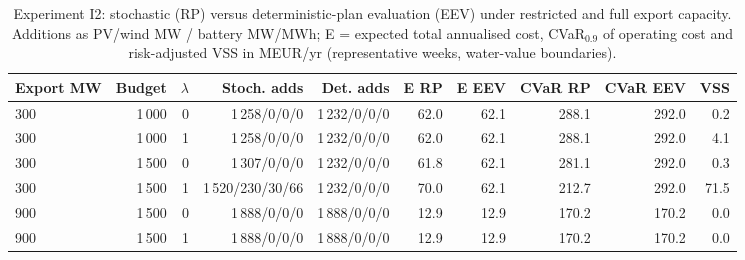 \begin{table}[htbp]
\centering
\scriptsize
\caption{Experiment I2: stochastic (RP) versus deterministic-plan evaluation (EEV) under restricted and full export capacity. Additions as PV/wind MW / battery MW/MWh; E = expected total annualised cost, CVaR$_{0.9}$ of operating cost and risk-adjusted VSS in MEUR/yr (representative weeks, water-value boundaries).}
\label{tab:i2}
\begin{adjustbox}{max width=\linewidth}
\begin{tabular}{lrrrrrrrrr}
\toprule
Export MW & Budget & $\lambda$ & Stoch. adds & Det. adds & E RP & E EEV & CVaR RP & CVaR EEV & VSS \\
\midrule
300 & 1\,000 & 0 & 1\,258/0/0/0 & 1\,232/0/0/0 & 62.0 & 62.1 & 288.1 & 292.0 & 0.2 \\
300 & 1\,000 & 1 & 1\,258/0/0/0 & 1\,232/0/0/0 & 62.0 & 62.1 & 288.1 & 292.0 & 4.1 \\
300 & 1\,500 & 0 & 1\,307/0/0/0 & 1\,232/0/0/0 & 61.8 & 62.1 & 281.1 & 292.0 & 0.3 \\
300 & 1\,500 & 1 & 1\,520/230/30/66 & 1\,232/0/0/0 & 70.0 & 62.1 & 212.7 & 292.0 & 71.5 \\
900 & 1\,500 & 0 & 1\,888/0/0/0 & 1\,888/0/0/0 & 12.9 & 12.9 & 170.2 & 170.2 & 0.0 \\
900 & 1\,500 & 1 & 1\,888/0/0/0 & 1\,888/0/0/0 & 12.9 & 12.9 & 170.2 & 170.2 & 0.0 \\
\bottomrule
\end{tabular}
\end{adjustbox}
\end{table}
